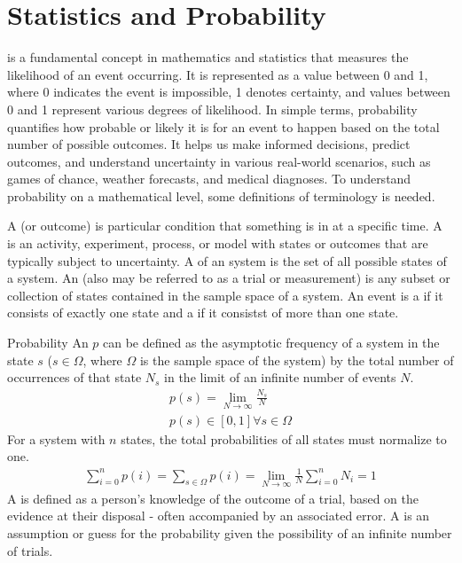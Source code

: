 \chapter{Statistics and Probability}
\thispagestyle{fancy}

 is a fundamental concept in mathematics and statistics that measures the likelihood of an event occurring. It is represented as a value between 0 and 1, where 0 indicates the event is impossible, 1 denotes certainty, and values between 0 and 1 represent various degrees of likelihood. In simple terms, probability quantifies how probable or likely it is for an event to happen based on the total number of possible outcomes. It helps us make informed decisions, predict outcomes, and understand uncertainty in various real-world scenarios, such as games of chance, weather forecasts, and medical diagnoses. To understand probability on a mathematical level, some definitions of terminology is needed.

A  (or outcome) is particular condition that something is in at a specific time. A  is an activity, experiment, process, or model with states or outcomes that are typically subject to uncertainty. A  of an system is the set of all possible states of a system. An  (also may be referred to as a trial or measurement) is any subset or collection of states contained in the sample space of a system. An event is a  if it consists of exactly one state and a  if it consistst of more than one state.

\begin{defn}[Probability]{Probability}
An  $p$ can be defined as the asymptotic frequency of a system in the state $s$ ($s \in \Omega$, where $\Omega$ is the sample space of the system) by the total number of occurrences of that state $N_s$ in the limit of an infinite number of events $N$.
    \begin{align}
        p(s) = \lim_{N\rightarrow\infty}\frac{N_s}{N} \\
	p(s) \in [0,1] \forall s \in \Omega
    \end{align}
For a system with $n$ states, the total probabilities of all states must normalize to one.
    \begin{align}
        \sum_{i=0}^{n}p(i) = \sum_{s \in \Omega}p(i) = \lim_{N\rightarrow\infty}\frac{1}{N}\sum_{i=0}^{n}N_i = 1
    \end{align}
A  is defined as a person's knowledge of the outcome of a trial, based on the evidence at their disposal - often accompanied by an associated error. A  is an assumption or guess for the probability given the possibility of an infinite number of trials.
\end{defn}

